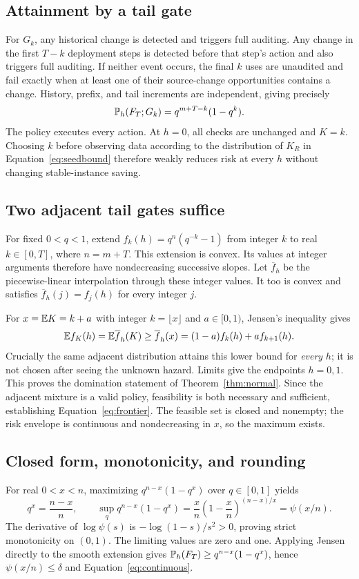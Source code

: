 \subsection{Attainment by a tail gate}
For $G_k$, any historical change is detected and triggers full auditing. Any change in the first $T-k$ deployment steps is detected before that step's action and also triggers full auditing. If neither event occurs, the final $k$ uses are unaudited and fail exactly when at least one of their source-change opportunities contains a change. History, prefix, and tail increments are independent, giving precisely
\begin{equation}
 \mathbb P_h(F_T;G_k)=q^{m+T-k}(1-q^k).
\end{equation}
The policy executes every action. At $h=0$, all checks are unchanged and $K=k$. Choosing $k$ before observing data according to the distribution of $K_R$ in Equation~\eqref{eq:seedbound} therefore weakly reduces risk at every $h$ without changing stable-instance saving.

\subsection{Two adjacent tail gates suffice}
For fixed $0<q<1$, extend $f_k(h)=q^n(q^{-k}-1)$ from integer $k$ to real $k\in[0,T]$, where $n=m+T$. This extension is convex. Its values at integer arguments therefore have nondecreasing successive slopes. Let $\overline f_h$ be the piecewise-linear interpolation through these integer values. It too is convex and satisfies $\overline f_h(j)=f_j(h)$ for every integer $j$.

For $x=\mathbb E K=k+a$ with integer $k=\lfloor x\rfloor$ and $a\in[0,1)$, Jensen's inequality gives
\begin{equation}
 \mathbb E f_K(h)=\mathbb E\overline f_h(K)\geq\overline f_h(x)=(1-a)f_k(h)+af_{k+1}(h).
\end{equation}
Crucially the same adjacent distribution attains this lower bound for \emph{every} $h$; it is not chosen after seeing the unknown hazard. Limits give the endpoints $h=0,1$. This proves the domination statement of Theorem~\ref{thm:normal}. Since the adjacent mixture is a valid policy, feasibility is both necessary and sufficient, establishing Equation~\eqref{eq:frontier}. The feasible set is closed and nonempty; the risk envelope is continuous and nondecreasing in $x$, so the maximum exists.

\subsection{Closed form, monotonicity, and rounding}
For real $0<x<n$, maximizing $q^{n-x}(1-q^x)$ over $q\in[0,1]$ yields
\begin{equation}
 q^x=\frac{n-x}{n},\qquad
 \sup_q q^{n-x}(1-q^x)
 =\frac{x}{n}\left(1-\frac{x}{n}\right)^{(n-x)/x}=\psi(x/n).
\end{equation}
The derivative of $\log\psi(s)$ is $-\log(1-s)/s^2>0$, proving strict monotonicity on $(0,1)$. The limiting values are zero and one. Applying Jensen directly to the smooth extension gives $\mathbb P_h(F_T)\geq q^{n-x}(1-q^x)$, hence $\psi(x/n)\leq\delta$ and Equation~\eqref{eq:continuous}.

